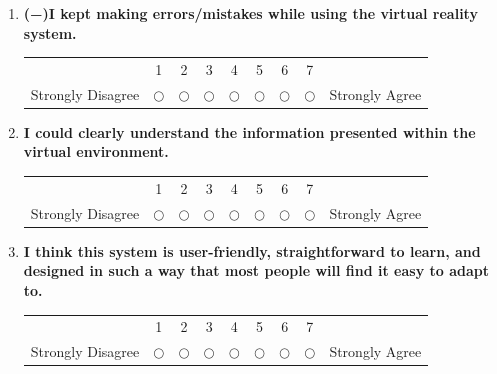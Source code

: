 \documentclass[inscr,ack,preface]{dithesis}
\begin{document}
\begin{appendix}
\begin{enumerate}
    \item \begin{minipage}[t]{\linewidth}
            \textbf{(−)I kept making errors/mistakes while using the virtual reality system.}
            \begin{center}
              \small
              \renewcommand{\arraystretch}{1.5}
              \begin{tabular}{ccccccccc}
                                  & 1          & 2          & 3          & 4          & 5          & 6          & 7          &                \\
                Strongly Disagree & $\bigcirc$ & $\bigcirc$ & $\bigcirc$ & $\bigcirc$ & $\bigcirc$ & $\bigcirc$ & $\bigcirc$ & Strongly Agree
              \end{tabular}
            \end{center}
          \end{minipage}


    \item \begin{minipage}[t]{\linewidth}
            \textbf{I could clearly understand the information presented within the virtual environment.}
            \begin{center}
              \small
              \renewcommand{\arraystretch}{1.5}
              \begin{tabular}{ccccccccc}
                                  & 1          & 2          & 3          & 4          & 5          & 6          & 7          &                \\
                Strongly Disagree & $\bigcirc$ & $\bigcirc$ & $\bigcirc$ & $\bigcirc$ & $\bigcirc$ & $\bigcirc$ & $\bigcirc$ & Strongly Agree
              \end{tabular}
            \end{center}
          \end{minipage}


    \item \begin{minipage}[t]{\linewidth}
            \textbf{I think this system is user-friendly, straightforward to learn, and designed in such a way that most people will find it easy to adapt to.}
            \begin{center}
              \small
              \renewcommand{\arraystretch}{1.5}
              \begin{tabular}{ccccccccc}
                                  & 1          & 2          & 3          & 4          & 5          & 6          & 7          &                \\
                Strongly Disagree & $\bigcirc$ & $\bigcirc$ & $\bigcirc$ & $\bigcirc$ & $\bigcirc$ & $\bigcirc$ & $\bigcirc$ & Strongly Agree
              \end{tabular}
            \end{center}
          \end{minipage}



\end{enumerate}
\end{appendix}
\end{document}
